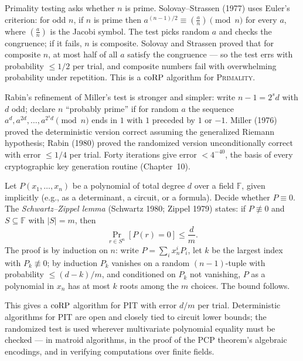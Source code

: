 \begin{example}
Primality testing asks whether $n$ is prime. Solovay--Strassen (1977) uses Euler's criterion: for odd $n$, if $n$ is prime then $a^{(n-1)/2} \equiv (\frac{a}{n}) \pmod{n}$ for every $a$, where $(\frac{a}{n})$ is the Jacobi symbol. The test picks random $a$ and checks the congruence; if it fails, $n$ is composite. Solovay and Strassen proved that for composite $n$, at most half of all $a$ satisfy the congruence --- so the test errs with probability $\le 1/2$ per trial, and composite numbers fail with overwhelming probability under repetition. This is a $\text{coRP}$ algorithm for \textsc{Primality}.

Rabin's refinement of Miller's test is stronger and simpler: write $n - 1 = 2^s d$ with $d$ odd; declare $n$ ``probably prime'' if for random $a$ the sequence $a^d, a^{2d}, \dots, a^{2^s d} \pmod{n}$ ends in $1$ with $1$ preceded by $1$ or $-1$. Miller (1976) proved the deterministic version correct assuming the generalized Riemann hypothesis; Rabin (1980) proved the randomized version unconditionally correct with error $\le 1/4$ per trial. Forty iterations give error $< 4^{-40}$, the basis of every cryptographic key generation routine (Chapter~10).
\end{example}

\begin{example}
Let $P(x_1, \dots, x_n)$ be a polynomial of total degree $d$ over a field $\mathbb{F}$, given implicitly (e.g., as a determinant, a circuit, or a formula). Decide whether $P \equiv 0$. The \emph{Schwartz--Zippel lemma} (Schwartz 1980; Zippel 1979) states: if $P \not\equiv 0$ and $S \subseteq \mathbb{F}$ with $|S| = m$, then
\[
\Pr_{r \in S^n}[P(r) = 0] \le \frac{d}{m}.
\]
The proof is by induction on $n$: write $P = \sum_i x_n^i P_i$, let $k$ be the largest index with $P_k \not\equiv 0$; by induction $P_k$ vanishes on a random $(n-1)$-tuple with probability $\le (d-k)/m$, and conditioned on $P_k$ not vanishing, $P$ as a polynomial in $x_n$ has at most $k$ roots among the $m$ choices. The bound follows.

This gives a $\text{coRP}$ algorithm for \textsc{PIT} with error $d/m$ per trial. Deterministic algorithms for \textsc{PIT} are open and closely tied to circuit lower bounds; the randomized test is used wherever multivariate polynomial equality must be checked --- in matroid algorithms, in the proof of the PCP theorem's algebraic encodings, and in verifying computations over finite fields.
\end{example}


